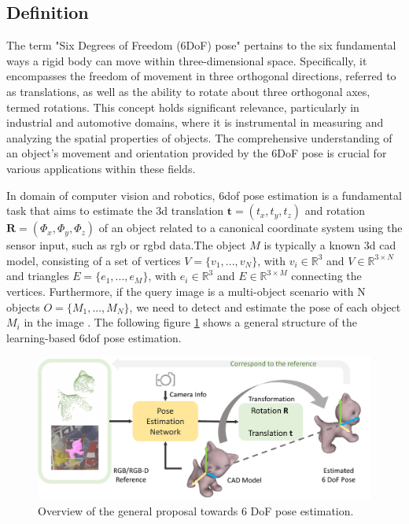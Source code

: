 \documentclass[12pt,DIV14,BCOR12mm,a4paper,footinclude=false,headinclude,parskip=half-,twoside,openright,cleardoublepage=empty,toc=index,bibliography=totoc,listof=totoc]{scrreprt}
\numberwithin{equation}{chapter}
\begin{document}
\subsection{Definition}
The term "Six Degrees of Freedom (6DoF) pose" pertains to the six fundamental ways a rigid body can move within three-dimensional space. Specifically, it encompasses the freedom of movement in three orthogonal directions, referred to as translations, as well as the ability to rotate about three orthogonal axes, termed rotations. This concept holds significant relevance, particularly in industrial and automotive domains, where it is instrumental in measuring and analyzing the spatial properties of objects. The comprehensive understanding of an object's movement and orientation provided by the 6DoF pose is crucial for various applications within these fields.

In domain of computer vision and robotics, \gls{6dof} pose estimation is a fundamental task that aims to estimate the \gls{3d} translation $\mathbf{t}=(t_{x} ,t_{y} ,t_{z} )$ and rotation $\mathbf{R}=(\Phi_{x} ,\Phi_{y} ,\Phi_{z} )$ of an object related to a canonical coordinate system using the sensor input, such as \gls{rgb} or \gls{rgbd} data.The object $M$ is typically a known \gls{3d} \gls{cad} model, consisting of a set of vertices $V=\{v_1,...,v_N\}$, with $v_i\in \mathbb{R}^3$ and $V\in \mathbb{R}^{3 \times N}$ and triangles $E=\{e_1,...,e_M\}$, with $e_i\in \mathbb{R}^3$ and $E\in \mathbb{R}^{3\times M}$ connecting the vertices. Furthermore, if the query image is a multi-object scenario with N objects $O=\{M_1,...,M_N\}$, we need to detect and estimate the pose of each object $M_i$ in the image \cite{Fabian_2021}. The following figure \ref{img:6d} shows a general structure of the learning-based \gls{6dof} pose estimation.

\begin{figure}[h]
	\centering
	\includegraphics[width=1.\textwidth]{img/6d.pdf}
	\caption{Overview of the general proposal towards 6 DoF pose estimation.}
	\label{img:6d}
\end{figure}
\end{document}
